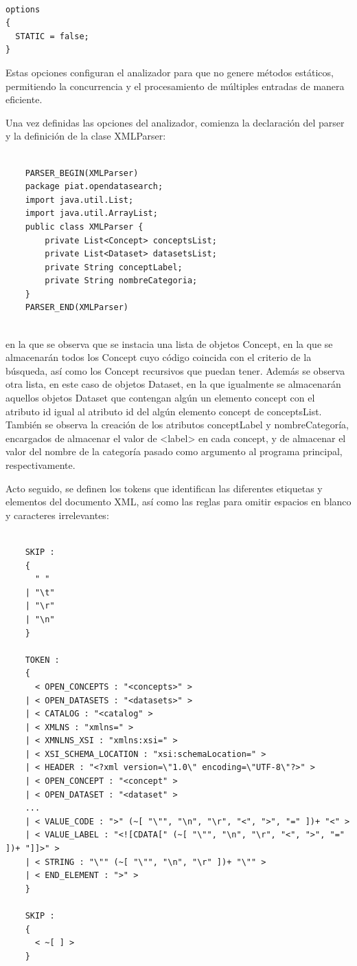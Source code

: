 \lstset{inputencoding=utf8/latin1}
\begin{lstlisting}
    
options
{
  STATIC = false;
}
\end{lstlisting}

Estas opciones configuran el analizador para que no genere métodos estáticos, permitiendo la concurrencia y el procesamiento de múltiples entradas de manera eficiente.

Una vez definidas las opciones del analizador, comienza la declaración del parser y la definición de la clase XMLParser:

\lstset{inputencoding=utf8/latin1}
\begin{lstlisting}
    
    PARSER_BEGIN(XMLParser)
    package piat.opendatasearch;
    import java.util.List;
    import java.util.ArrayList;
    public class XMLParser {
        private List<Concept> conceptsList;
        private List<Dataset> datasetsList;
        private String conceptLabel;
        private String nombreCategoria;
    }
    PARSER_END(XMLParser)
    
\end{lstlisting}

en la que se observa que se instacia una lista de objetos Concept, en la que se almacenarán todos los Concept cuyo código coincida con el criterio de la búsqueda, así como los Concept recursivos que puedan tener.
Además se observa otra lista, en este caso de objetos Dataset, en la que igualmente se almacenarán aquellos objetos Dataset que contengan algún un elemento concept con el atributo id igual al atributo id del algún elemento concept de conceptsList.
También se observa la creación de los atributos conceptLabel y nombreCategoría, encargados de almacenar el valor de <label> en cada concept, y de almacenar el valor del nombre de la categoría pasado como argumento al programa principal, respectivamente.

Acto seguido, se definen los tokens que identifican las diferentes etiquetas y elementos del documento XML, así como las reglas para omitir espacios en blanco y caracteres irrelevantes:

\lstset{inputencoding=utf8/latin1}
\begin{lstlisting}
    
    SKIP :
    {
      " "
    | "\t"
    | "\r"
    | "\n"
    }
    
    TOKEN :
    {
      < OPEN_CONCEPTS : "<concepts>" >
    | < OPEN_DATASETS : "<datasets>" >
    | < CATALOG : "<catalog" >
    | < XMLNS : "xmlns=" >
    | < XMNLNS_XSI : "xmlns:xsi=" >
    | < XSI_SCHEMA_LOCATION : "xsi:schemaLocation=" >
    | < HEADER : "<?xml version=\"1.0\" encoding=\"UTF-8\"?>" >
    | < OPEN_CONCEPT : "<concept" >
    | < OPEN_DATASET : "<dataset" >
    ...
    | < VALUE_CODE : ">" (~[ "\"", "\n", "\r", "<", ">", "=" ])+ "<" >
    | < VALUE_LABEL : "<![CDATA[" (~[ "\"", "\n", "\r", "<", ">", "=" ])+ "]]>" >
    | < STRING : "\"" (~[ "\"", "\n", "\r" ])+ "\"" >
    | < END_ELEMENT : ">" >
    }
    
    SKIP :
    {
      < ~[ ] >
    }
    
    
\end{lstlisting}

